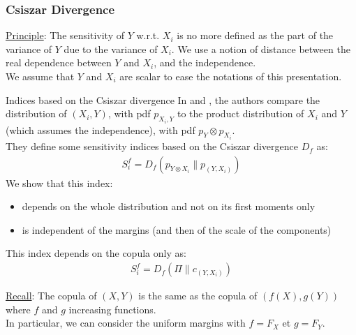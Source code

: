 \documentclass[8pt]{beamer}
\begin{document}
\begin{frame}
 \frametitle{Csiszar Divergence}
\small
\underline{Principle}: The sensitivity of $Y$ w.r.t. $X_i$ is no more defined as the part of the variance of $Y$ due to the variance of $X_i$. We use a notion of distance between the real dependence between $Y$ and $X_i$, and the independence.\\
We assume that $Y$ and $X_i$ are scalar to ease the notations of this presentation.

\begin{block}{Indices based on the Csiszar divergence}
 In \cite{Borgonovo2016} and \cite{DaVeiga2013} , the authors compare the distribution of  $(X_i,Y)$, with pdf $p_{X_i,Y}$ to the product distribution of $X_i$ and $Y$ (which assumes the independence), with pdf $p_{Y}\otimes p_{X_i}$. \\
 They define some sensitivity indices based on the  \alert{Csiszar divergence $D_f$} as:
    \begin{align*}
      S_i^f= D_f(p_{Y \otimes X_i} \| p_{(Y,X_i)})
    \end{align*}
 We show that this index: 
 \begin{itemize}
  \item depends on the whole distribution and not on its first moments only
  \item is independent of the margins (and then of the scale of the components)
 \end{itemize}
This index depends on the copula only as:
    \alert{\begin{align*}
      S_i^f= D_f(\Pi \| c_{(Y,X_i)})
    \end{align*}}

\end{block}

\underline{Recall}: The copula of $(X,Y)$ is the same as the copula of $(f(X), g(Y))$ where $f$ and $g$ increasing functions.\\
In particular, we can consider the uniform margins with  $f = F_X$ et $g = F_Y$.
\end{frame}



\end{document}
